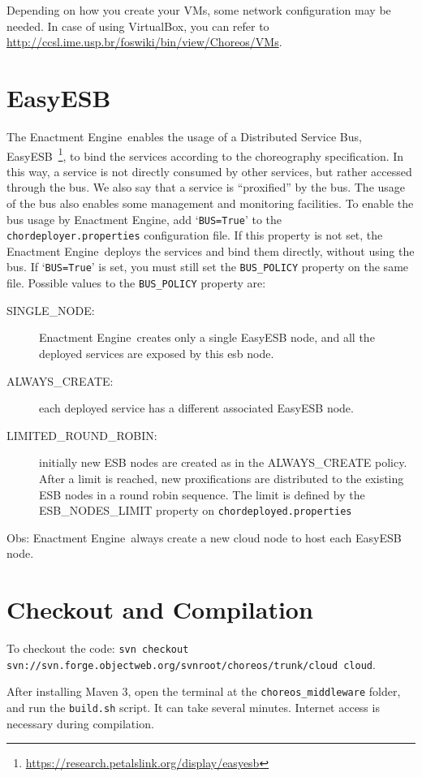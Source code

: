 \documentclass[a4paper, 10pt]{article}
\newcommand{\ee}{Enactment Engine}
\begin{document}
Depending on how you create your VMs, some network configuration may be needed. In case of using VirtualBox, you can refer to \url{http://ccsl.ime.usp.br/foswiki/bin/view/Choreos/VMs}.

\section{EasyESB}

The \ee\ enables the usage of a Distributed Service Bus, EasyESB~\footnote{\url{https://research.petalslink.org/display/easyesb}}, to bind the services according to the choreography specification. In this way, a service is not directly consumed by other services, but rather accessed through the bus. We also say that a service is ``proxified'' by the bus. The usage of the bus also enables some management and monitoring facilities. To enable the bus usage by \ee, add `\texttt{BUS=True}' to the \texttt{chordeployer.properties} configuration file. If this property is not set, the \ee\ deploys the services and bind them directly, without using the bus. If `\texttt{BUS=True}' is set, you must still set the \texttt{BUS\_POLICY} property on the same file. Possible values to the \texttt{BUS\_POLICY} property are:

\begin{description}
\item [SINGLE\_NODE:] \ee\ creates only a single EasyESB node, and all the deployed services are exposed by this esb node.
\item [ALWAYS\_CREATE:] each deployed service has a different associated EasyESB node. 
\item [LIMITED\_ROUND\_ROBIN:] initially new ESB nodes are created as in the ALWAYS\_CREATE policy. After a limit is reached, new proxifications are distributed to the existing ESB nodes in a round robin sequence. The limit is defined by the ESB\_NODES\_LIMIT property on \texttt{chordeployed.properties}
\end{description}

Obs: \ee\ always create a new cloud node to host each EasyESB node.

\section{Checkout and Compilation}

To checkout the code: \texttt{svn checkout svn://svn.forge.objectweb.org/svnroot/choreos/trunk/cloud cloud}. 

After installing Maven 3, open the terminal at the \texttt{choreos\_middleware} folder, and run the \texttt{build.sh} script. It can take several minutes. Internet access is necessary during compilation.
\end{document}
